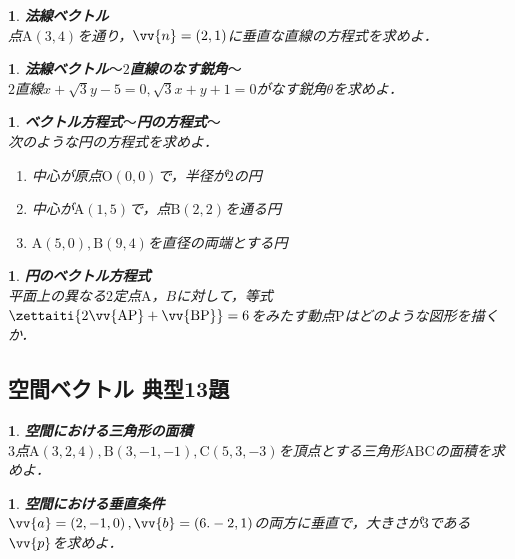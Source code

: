 \documentclass[10pt,
fleqn,
dvipdfmx,
uplatex
]{jsarticle}
\newtheorem{question}[Question]{}
\begin{document}
\begin{question}{\bf\boldmath 法線ベクトル}\\
点$\text{A}\left(3,4\right)$を通り，$\vv{n}=\left(2,1\right)$に垂直な直線の方程式を求めよ．
\end{question}



\begin{question}{\bf\boldmath 法線ベクトル$〜2$直線のなす鋭角$〜$}\\
$2$直線$x+\sqrt 3y-5=0, \sqrt 3x+y+1=0$がなす鋭角$\theta$を求めよ．
\end{question}



\begin{question}{\bf\boldmath ベクトル方程式$〜$円の方程式$〜$}\\
次のような円の方程式を求めよ．
\begin{enumerate}
\item 中心が原点$\text{O}\left(0,0\right)$で，半径が$2$の円
\item 中心が$\text{A}\left(1,5\right)$で，点$\text{B}\left(2,2\right)$を通る円
\item $\text{A}\left(5,0\right), \text{B}\left(9,4\right)$を直径の両端とする円
\end{enumerate}

\end{question}



\begin{question}{\bf\boldmath 円のベクトル方程式}\\
平面上の異なる$2$定点$\text{A}$，$B$に対して，等式$\zettaiti{2\vv {\text{AP}}+\vv {\text{BP}}}=6$をみたす動点$\text{P}$はどのような図形を描くか．
\end{question}

\subsection{空間ベクトル 典型13題}



\begin{question}{\bf\boldmath 空間における三角形の面積}\\
$3$点$\text{A}\left(3,2,4\right), \text{B}\left(3,-1,-1\right), \text{C}\left(5,3,-3\right)$を頂点とする三角形$\text{ABC}$の面積を求めよ．
\end{question}



\begin{question}{\bf\boldmath 空間における垂直条件}\\
$\vv{a}=\left(2,-1,0\right),$$\vv{b}=\left(6.-2,1\right)$の両方に垂直で，大きさが$3$である$\vv{p}$を求めよ．
\end{question}
\end{document}
